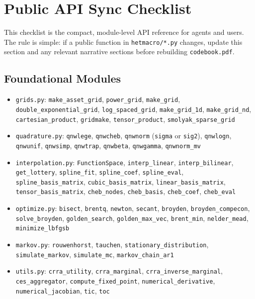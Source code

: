 \documentclass[12pt]{book}
\begin{document}
\section{Public API Sync Checklist}

This checklist is the compact, module-level API reference for agents and users. The rule is simple: if a public function in \texttt{hetmacro/*.py} changes, update this section and any relevant narrative sections before rebuilding \texttt{codebook.pdf}.

\subsection{Foundational Modules}
\begin{itemize}
    \item \texttt{grids.py}: \texttt{make\_asset\_grid}, \texttt{power\_grid}, \texttt{make\_grid}, \texttt{double\_exponential\_grid}, \texttt{log\_spaced\_grid}, \texttt{make\_grid\_1d}, \texttt{make\_grid\_nd}, \texttt{cartesian\_product}, \texttt{gridmake}, \texttt{tensor\_product}, \texttt{smolyak\_sparse\_grid}
    \item \texttt{quadrature.py}: \texttt{qnwlege}, \texttt{qnwcheb}, \texttt{qnwnorm} (\texttt{sigma} or \texttt{sig2}), \texttt{qnwlogn}, \texttt{qnwunif}, \texttt{qnwsimp}, \texttt{qnwtrap}, \texttt{qnwbeta}, \texttt{qnwgamma}, \texttt{qnwnorm\_mv}
    \item \texttt{interpolation.py}: \texttt{FunctionSpace}, \texttt{interp\_linear}, \texttt{interp\_bilinear}, \texttt{get\_lottery}, \texttt{spline\_fit}, \texttt{spline\_coef}, \texttt{spline\_eval}, \texttt{spline\_basis\_matrix}, \texttt{cubic\_basis\_matrix}, \texttt{linear\_basis\_matrix}, \texttt{tensor\_basis\_matrix}, \texttt{cheb\_nodes}, \texttt{cheb\_basis}, \texttt{cheb\_coef}, \texttt{cheb\_eval}
    \item \texttt{optimize.py}: \texttt{bisect}, \texttt{brentq}, \texttt{newton}, \texttt{secant}, \texttt{broyden}, \texttt{broyden\_compecon}, \texttt{solve\_broyden}, \texttt{golden\_search}, \texttt{golden\_max\_vec}, \texttt{brent\_min}, \texttt{nelder\_mead}, \texttt{minimize\_lbfgsb}
    \item \texttt{markov.py}: \texttt{rouwenhorst}, \texttt{tauchen}, \texttt{stationary\_distribution}, \texttt{simulate\_markov}, \texttt{simulate\_mc}, \texttt{markov\_chain\_ar1}
    \item \texttt{utils.py}: \texttt{crra\_utility}, \texttt{crra\_marginal}, \texttt{crra\_inverse\_marginal}, \texttt{ces\_aggregator}, \texttt{compute\_fixed\_point}, \texttt{numerical\_derivative}, \texttt{numerical\_jacobian}, \texttt{tic}, \texttt{toc}
\end{itemize}
\end{document}
